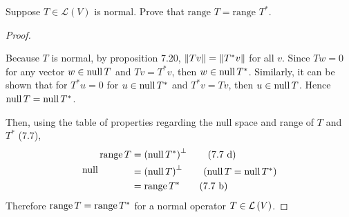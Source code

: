 Suppose $T \in \mathcal{L}(V)$ is normal.  Prove that $\text{range }T = \text{range }T^*$.
\begin{proof} $\;$

    \nl Because $T$ is normal, by proposition 7.20, $\left\| {Tv} \right\| = \left\| {T^*v} \right\|$ for all $v$. Since $Tw = 0$ for any vector $w \in \operatorname{null} T$ and $Tv = T^*v$, then $w \in \operatorname{null} T^*$. Similarly, it can be shown that for $T^*u = 0$ for $u \in \operatorname{null} T^*$ and $T^*v = Tv$, then $u \in \operatorname{null} T$. Hence $\operatorname{null} T = \operatorname{null} T^*$. 
    
    \nl Then, using the table of properties regarding the null space and range of $T$ and $T^*$ (7.7),
    \begin{align*}
        \range T &= \pars{\null T^*}^{\perp} \tag{7.7 d}\\
         &= \pars{\null T}^{\perp} \tag{$\null T = \null T^*$}
         \\ &= \range T^* \tag{7.7 b}
    \end{align*}
    Therefore $\operatorname{range}{T} = \operatorname{range}{T}^*$ for a normal operator $T \in \mathcal{L}\left({V}\right)$.

\end{proof}
